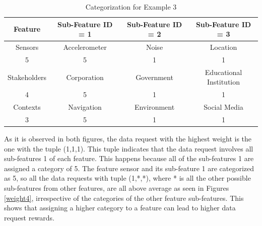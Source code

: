 \begin{table}[h!]
  \centering
  \caption{Categorization for Example 3}
  \label{tab:scenario4}
  \begin{tabular}{cccc}
    \toprule
    Feature & Sub-Feature ID = 1 & Sub-Feature ID = 2 & Sub-Feature ID = 3\\
    \midrule
    Sensors & Accelerometer & Noise & Location\\
     5 & 5 & 1 & 1\\ \hhline{====}
     Stakeholders & Corporation & Government & Educational Institution\\
     4 & 5 & 1 & 1\\ \hhline{====}
     Contexts & Navigation & Environment & Social Media\\
     3 & 5 & 1 & 1\\ 
    \bottomrule
  \end{tabular}
\end{table}

As it is observed in both figures, the data request with the highest weight is the one with the tuple (1,1,1). This tuple indicates that the data request involves all sub-features 1 of each feature. This happens because all of the sub-features 1 are assigned a category of 5. The feature sensor and its sub-feature 1 are categorized as 5, so all the data requests
with tuple (1,*,*), where * is all the other possible sub-features from other features, are all above average as seen in Figures \ref{weight4}, irrespective of the categories of the other feature sub-features. This shows that assigning a higher category to a feature can lead to higher data request rewards. 



%

